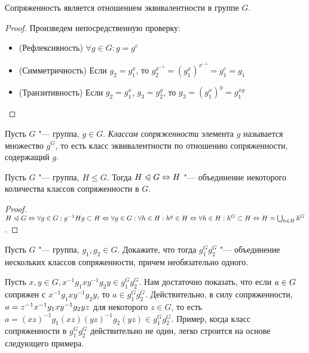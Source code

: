\begin{proposition}
	Сопряженность является отношением эквивалентности в группе $G$.
\end{proposition}

\begin{proof} Произведем непосредственную проверку:
	\begin{itemize}
		\item (Рефлексивность) $\forall g \in G: g = g^e$
		\item (Симметричность) Если $g_2 = g_1^x$, то $g_2^{x^{-1}} = (g_1^x)^{x^{-1}} = g_1^e = g_1$
		\item (Транзитивность) Если $g_2 = g_1^x$, $g_3 = g_2^y$, то $g_3 = (g_1^x)^y = g_1^{xy}$
	\end{itemize}
\end{proof}

\begin{definition}
	Пусть $G$ "--- группа, $g \in G$. \textit{Классом сопряженности} элемента $g$ называется множество $g^G$, то есть класс эквивалентности по отношению сопряженности, содержащий $g$.
\end{definition}

\begin{proposition}
	Пусть $G$ "--- группа, $H \le G$. Тогда $H \normal G \hm\Leftrightarrow H$ "--- объединение некоторого количества классов сопряженности в $G$.
\end{proposition}

\begin{proof}
	$H \normal G \Leftrightarrow \forall g \in G: g^{-1}Hg \subset H \Leftrightarrow \forall g \in G: \forall h \hm\in H: h^g \in H \Leftrightarrow \forall h \in H: h^G \subset H \Leftrightarrow H = \bigcup_{h \in H}h^G$.
\end{proof}

\begin{exercise}
	Пусть $G$ "--- группа, $g_1, g_2 \in G$. Докажите, что тогда $g_1^Gg_2^G$ "--- объединение нескольких классов сопряженности, причем необязательно одного.
\end{exercise}

\begin{solution}
	Пусть $x, y \in G, x^{-1}g_1xy^{-1}g_2y \in g_1^Gg_2^G$. Нам достаточно показать, что если $a \hm\in G$ сопряжен с $x^{-1}g_1xy^{-1}g_2y$, то $a \in g_1^Gg_2^G$. Действительно, в силу сопряженности, $a \hm= z^{-1}x^{-1}g_1xy^{-1}g_2yz$ для некоторого $z \in G$, то есть $a = (xz)^{-1}g_1(xz)(yz)^{-1}g_2(yz) \in g_1^Gg_2^G$. Пример, когда класс сопряженности в $g_1^Gg_2^G$ действительно не один, легко строится на основе следующего примера.
\end{solution}


